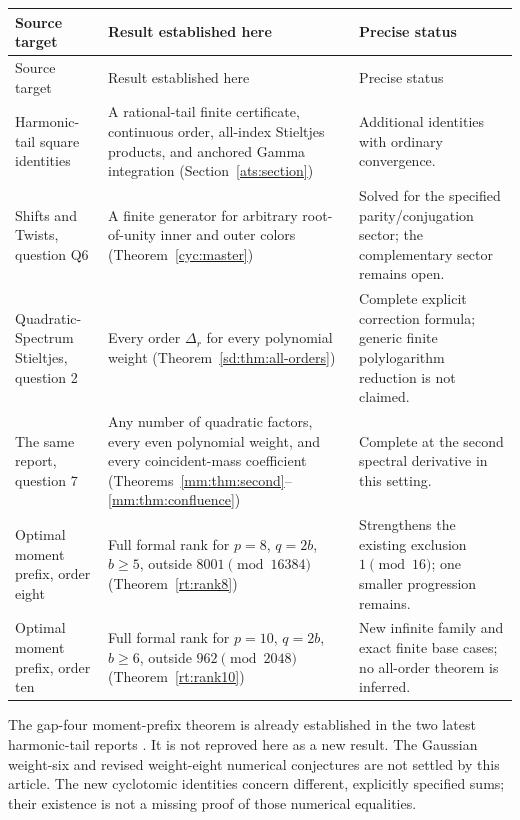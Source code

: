 \documentclass[11pt,a4paper]{article}
\numberwithin{equation}{section}
\theoremstyle{definition}
\theoremstyle{remark}
\begin{document}
\begin{longtable}{@{}>{\raggedright\arraybackslash}p{}>{\raggedright\arraybackslash}p{}>{\raggedright\arraybackslash}p{}@{}}
\toprule
Source target & Result established here & Precise status\\
\midrule
\endfirsthead
\toprule Source target & Result established here & Precise status\\\midrule
\endhead
Harmonic-tail square identities & A rational-tail finite certificate,
continuous order, all-index Stieltjes products, and anchored Gamma
integration (Section~\ref{ats:section}) & Additional identities with
ordinary convergence.\\[5pt]
Shifts and Twists, question Q6 \cite{HTST} & A finite generator for
arbitrary root-of-unity inner and outer colors
(Theorem~\ref{cyc:master}) & Solved for the specified parity/conjugation
sector; the complementary sector remains open.\\[5pt]
Quadratic-Spectrum Stieltjes, question 2 \cite{QSpec} & Every order
$\Delta_r$ for every polynomial weight
(Theorem~\ref{sd:thm:all-orders}) & Complete explicit correction formula;
generic finite polylogarithm reduction is not claimed.\\[5pt]
The same report, question 7 & Any number of quadratic factors, every
even polynomial weight, and every coincident-mass coefficient
(Theorems~\ref{mm:thm:second}--\ref{mm:thm:confluence}) & Complete at the
second spectral derivative in this setting.\\[5pt]
Optimal moment prefix, order eight \cite{PRR} & Full formal rank for
$p=8$, $q=2b$, $b\ge5$, outside $8001\pmod{16384}$
(Theorem~\ref{rt:rank8}) & Strengthens the existing exclusion
$1\pmod{16}$; one smaller progression remains.\\[5pt]
Optimal moment prefix, order ten & Full formal rank for $p=10$,
$q=2b$, $b\ge6$, outside $962\pmod{2048}$
(Theorem~\ref{rt:rank10}) & New infinite family and exact finite base
cases; no all-order theorem is inferred.\\
\bottomrule
\end{longtable}

The gap-four moment-prefix theorem is already established in the two
latest harmonic-tail reports \cite{HTGC,HTST}. It is not reproved here
as a new result. The Gaussian weight-six and revised weight-eight
numerical conjectures are not settled by this article. The new
cyclotomic identities concern different, explicitly specified sums;
their existence is not a missing proof of those numerical equalities.
\end{document}

